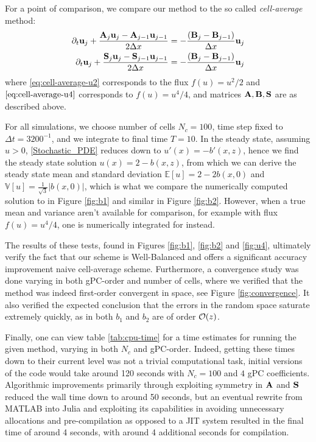 \documentclass[12pt]{article}
\begin{document}
For a point of comparison, we compare our method to the so called \textit{cell-average} method:
\begin{align}
    \label{eq:cell-average-u2}
    \partial_t\vb{u}_j + \frac{\mathbf{{A}}_j \vb{u}_j - \mathbf{{A}}_{j-1}\vb{u}_{j-1}}{2\Delta x} &=- \frac{(\mathbf{{B}}_j-\mathbf{{B}}_{j-1})}{\Delta x}\vb{u}_j \\
    \label{eq:cell-average-u4}
    \partial_t\vb{u}_j + \frac{\mathbf{{S}}_j \vb{u}_j - \mathbf{{S}}_{j-1}\vb{u}_{j-1}}{2\Delta x} &=- \frac{(\mathbf{{B}}_j-\mathbf{{B}}_{j-1})}{\Delta x}\vb{u}_j
\end{align}
where \eqref{eq:cell-average-u2} corresponds to the flux $f(u) = u^2 / 2$ and $\eqref{eq:cell-average-u4}$ corresponds to $f(u) = u^4 / 4$, and matrices $\mathbf{{A}}, \mathbf{{B}}, \mathbf{{S}}$ are as described above.


For all simulations, we choose number of cells $N_c = 100$, time step fixed to $\Delta t = 3200^{-1}$, and we integrate to final time $T = 10$. 
In the steady state, assuming $u > 0$, \eqref{Stochastic_PDE} reduces down to $u'(x) = -b'(x,z)$, hence we find the steady state solution $u(x) = 2 - b(x,z)$, from which we can derive the steady state mean and standard deviation $\mathbb{E}[u] = 2 - 2b(x,0)$ and $\mathbb{V}[u] = \frac{1}{\sqrt{3}} |b(x,0)|$, which is what we compare the numerically computed solution to in Figure \ref{fig:b1} and similar in Figure \ref{fig:b2}.
However, when a true mean and variance aren't available for comparison, for example with flux $f(u) = u^4 / 4$, one is numerically integrated for instead.

The results of these tests, found in Figures \ref{fig:b1}, \ref{fig:b2} and \ref{fig:u4}, ultimately verify the fact that our scheme is Well-Balanced and offers a significant accuracy improvement naive cell-average scheme. 
Furthermore, a convergence study was done varying in both gPC-order and number of cells, where we verified that the method was indeed first-order convergent in space, see Figure \ref{fig:convergence}. 
It also verified the expected conclusion that the errors in the random space saturate extremely quickly, as in both $b_1$ and $b_2$ are of order $\mathcal{O}(z)$.

Finally, one can view table \ref{tab:cpu-time} for a time estimates for running the given method, varying in both $N_c$ and gPC-order. 
Indeed, getting these times down to their current level was not a trivial computational task, initial versions of the code would take around 120 seconds with $N_c = 100$ and $4$ gPC coefficients.
Algorithmic improvements primarily through exploiting symmetry in $\mathbf{{A}}$ and $\mathbf{{S}}$ reduced the wall time down to around 50 seconds, but an eventual rewrite from MATLAB into Julia and exploiting its capabilities in avoiding unnecessary allocations and pre-compilation as opposed to a JIT system resulted in the final time of around 4 seconds, with around 4 additional seconds for compilation.
\end{document}
